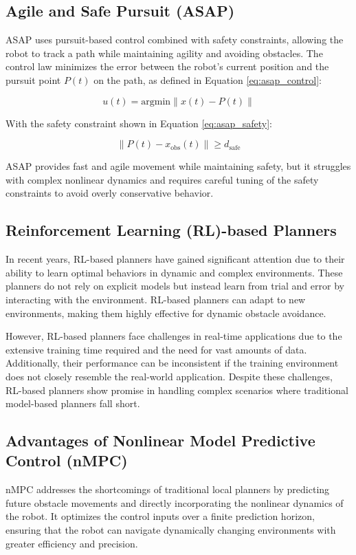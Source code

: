 \documentclass[conference]{IEEEtran}
\begin{document}
\subsection{Agile and Safe Pursuit (ASAP)}
ASAP uses pursuit-based control combined with safety constraints, allowing the robot to track a path while maintaining agility and avoiding obstacles. The control law minimizes the error between the robot’s current position and the pursuit point \(P(t)\) on the path, as defined in Equation \eqref{eq:asap_control}:

\begin{equation}
\label{eq:asap_control}
u(t) = \text{argmin} \| x(t) - P(t) \|
\end{equation}

With the safety constraint shown in Equation \eqref{eq:asap_safety}:

\begin{equation}
\label{eq:asap_safety}
\| P(t) - x_{\text{obs}}(t) \| \geq d_{\text{safe}}
\end{equation}

ASAP provides fast and agile movement while maintaining safety, but it struggles with complex nonlinear dynamics and requires careful tuning of the safety constraints to avoid overly conservative behavior.

\subsection{Reinforcement Learning (RL)-based Planners}
In recent years, RL-based planners have gained significant attention due to their ability to learn optimal behaviors in dynamic and complex environments. These planners do not rely on explicit models but instead learn from trial and error by interacting with the environment. RL-based planners can adapt to new environments, making them highly effective for dynamic obstacle avoidance.

However, RL-based planners face challenges in real-time applications due to the extensive training time required and the need for vast amounts of data. Additionally, their performance can be inconsistent if the training environment does not closely resemble the real-world application. Despite these challenges, RL-based planners show promise in handling complex scenarios where traditional model-based planners fall short.

\subsection{Advantages of Nonlinear Model Predictive Control (nMPC)}
nMPC addresses the shortcomings of traditional local planners by predicting future obstacle movements and directly incorporating the nonlinear dynamics of the robot. It optimizes the control inputs over a finite prediction horizon, ensuring that the robot can navigate dynamically changing environments with greater efficiency and precision.
\end{document}

